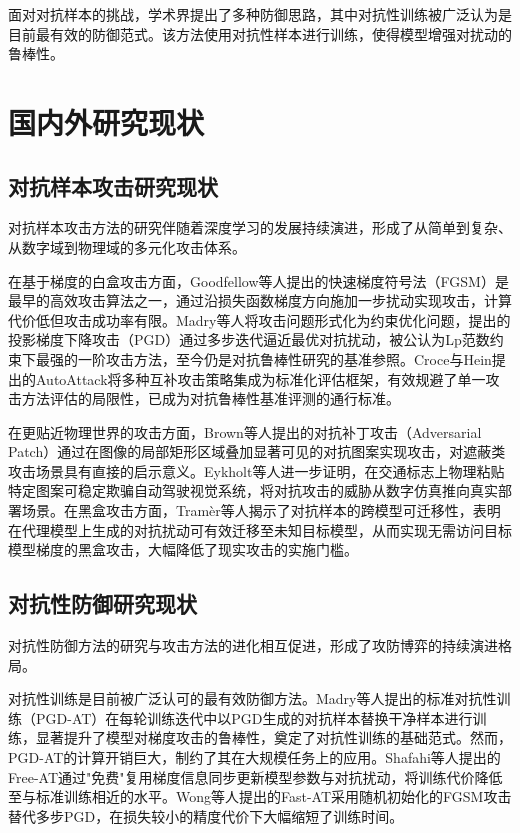 面对对抗样本的挑战，学术界提出了多种防御思路，其中对抗性训练\cite{madry2018pgd}被广泛认为是目前最有效的防御范式。该方法使用对抗性样本进行训练，使得模型增强对扰动的鲁棒性。


\section{国内外研究现状}

\subsection{对抗样本攻击研究现状}

对抗样本攻击方法的研究伴随着深度学习的发展持续演进，形成了从简单到复杂、从数字域到物理域的多元化攻击体系。

在基于梯度的白盒攻击方面，Goodfellow等人提出的快速梯度符号法（FGSM）\cite{goodfellow2015fgsm}是最早的高效攻击算法之一，通过沿损失函数梯度方向施加一步扰动实现攻击，计算代价低但攻击成功率有限。Madry等人将攻击问题形式化为约束优化问题，提出的投影梯度下降攻击（PGD）\cite{madry2018pgd}通过多步迭代逼近最优对抗扰动，被公认为Lp范数约束下最强的一阶攻击方法，至今仍是对抗鲁棒性研究的基准参照。Croce与Hein提出的AutoAttack\cite{croce2020autoattack}将多种互补攻击策略集成为标准化评估框架，有效规避了单一攻击方法评估的局限性，已成为对抗鲁棒性基准评测的通行标准。

在更贴近物理世界的攻击方面，Brown等人提出的对抗补丁攻击（Adversarial Patch）\cite{brown2017adversarialpatch}通过在图像的局部矩形区域叠加显著可见的对抗图案实现攻击，对遮蔽类攻击场景具有直接的启示意义。Eykholt等人进一步证明，在交通标志上物理粘贴特定图案可稳定欺骗自动驾驶视觉系统\cite{eykholt2018robust}，将对抗攻击的威胁从数字仿真推向真实部署场景。在黑盒攻击方面，Tram\`{e}r等人揭示了对抗样本的跨模型可迁移性\cite{tramer2018ensemble}，表明在代理模型上生成的对抗扰动可有效迁移至未知目标模型，从而实现无需访问目标模型梯度的黑盒攻击，大幅降低了现实攻击的实施门槛。

\subsection{对抗性防御研究现状}

对抗性防御方法的研究与攻击方法的进化相互促进，形成了攻防博弈的持续演进格局。

对抗性训练是目前被广泛认可的最有效防御方法。Madry等人提出的标准对抗性训练（PGD-AT）\cite{madry2018pgd}在每轮训练迭代中以PGD生成的对抗样本替换干净样本进行训练，显著提升了模型对梯度攻击的鲁棒性，奠定了对抗性训练的基础范式。然而，PGD-AT的计算开销巨大，制约了其在大规模任务上的应用。Shafahi等人提出的Free-AT\cite{shafahi2019free}通过"免费"复用梯度信息同步更新模型参数与对抗扰动，将训练代价降低至与标准训练相近的水平。Wong等人提出的Fast-AT\cite{wong2020fast}采用随机初始化的FGSM攻击替代多步PGD，在损失较小的精度代价下大幅缩短了训练时间。

